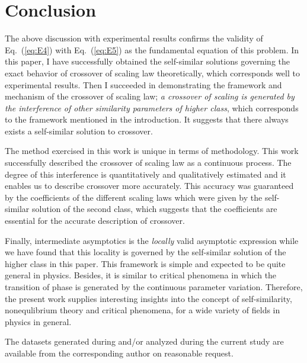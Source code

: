 \documentclass[default,iicol,10pt]{sn-jnl}%
\theoremstyle{thmstyleone}%
\theoremstyle{thmstyletwo}%
\theoremstyle{thmstylethree}%
\begin{document}
\section{Conclusion}

The above discussion with experimental results confirms the validity of Eq.~(\ref{eq:E4}) with Eq.~(\ref{eq:E5}) as the fundamental equation of this problem. In this paper, I have successfully obtained the self-similar solutions governing the exact behavior of crossover of scaling law theoretically, which corresponds well to experimental results. Then I succeeded in demonstrating the framework and mechanism of the crossover of scaling law; {\it a crossover of scaling is generated by the interference of other similarity parameters of higher class}, which corresponds to the framework mentioned in the introduction. It suggests that there always exists a self-similar solution to crossover.

The method exercised in this work is unique in terms of methodology. This work successfully described the crossover of scaling law as a continuous process. The degree of this interference is quantitatively and qualitatively estimated and it enables us to describe crossover more accurately. This accuracy was guaranteed by the coefficients of the different scaling laws which were given by the self-similar solution of the second class, which suggests that the coefficients are essential for the accurate description of crossover. 

Finally, intermediate asymptotics is the {\it locally} valid asymptotic expression while we have found that this locality is governed by the self-similar solution of the higher class in this paper. This framework is simple and expected to be quite general in physics. Besides, it is similar to critical phenomena in which the transition of phase is generated by the continuous parameter variation. Therefore, the present work supplies interesting insights into the concept of self-similarity, nonequlibrium theory and critical phenomena, for a wide variety of fields in physics in general. 

\backmatter



The datasets generated during and/or analyzed during the current study are available from the corresponding author on reasonable request.

\end{document}
